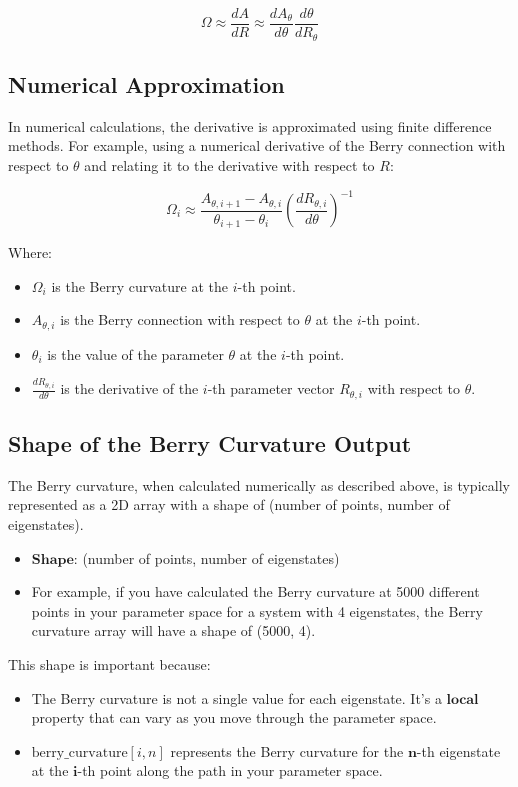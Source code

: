 \documentclass{article}
\begin{document}
$$
\Omega \approx \frac{dA}{dR} \approx \frac{dA_\theta}{d\theta} \frac{d\theta}{dR_\theta}
$$

\subsection{Numerical Approximation}

In numerical calculations, the derivative is approximated using finite difference methods. For example, using a numerical derivative of the Berry connection with respect to $\theta$ and relating it to the derivative with respect to $R$:

$$
\Omega_i \approx \frac{A_{\theta, i+1} - A_{\theta, i}}{\theta_{i+1} - \theta_i} \left( \frac{dR_{\theta, i}}{d\theta} \right)^{-1}
$$

Where:
\begin{itemize}
\item $\Omega_i$ is the Berry curvature at the $i$-th point.
\item $A_{\theta, i}$ is the Berry connection with respect to $\theta$ at the $i$-th point.
\item $\theta_i$ is the value of the parameter $\theta$ at the $i$-th point.
\item $\frac{dR_{\theta, i}}{d\theta}$ is the derivative of the $i$-th parameter vector $R_{\theta, i}$ with respect to $\theta$.
\end{itemize}

\subsection{Shape of the Berry Curvature Output}

The Berry curvature, when calculated numerically as described above, is typically represented as a 2D array with a shape of (number of points, number of eigenstates).

\begin{itemize}
\item $\textbf{Shape:}$ (number of points, number of eigenstates)
\item For example, if you have calculated the Berry curvature at 5000 different points in your parameter space for a system with 4 eigenstates, the Berry curvature array will have a shape of (5000, 4).
\end{itemize}

This shape is important because:

\begin{itemize}
\item The Berry curvature is not a single value for each eigenstate. It's a $\textbf{local}$ property that can vary as you move through the parameter space.
\item $\text{berry\_curvature}[i, n]$ represents the Berry curvature for the $\textbf{n}$-th eigenstate at the $\textbf{i}$-th point along the path in your parameter space.
\end{itemize}
\end{document}
